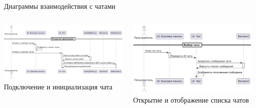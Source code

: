 \documentclass[aspectratio=169]{beamer}
\begin{document}
\begin{frame}{Диаграммы взаимодействия с чатами}
\vspace{0.5em}

\begin{columns}
    \begin{column}{0.5\textwidth}
        \centering
        \includegraphics[width=0.95\linewidth]{static/ChatConnectDiagram.png} \\
        \small Подключение и инициализация чата
    \end{column}
    \begin{column}{0.5\textwidth}
        \centering
        \includegraphics[width=0.95\linewidth]{static/ChatInteractionDiagram.png} \\
        \small Открытие и отображение списка чатов
    \end{column}
\end{columns}
\end{frame}
\end{document}
